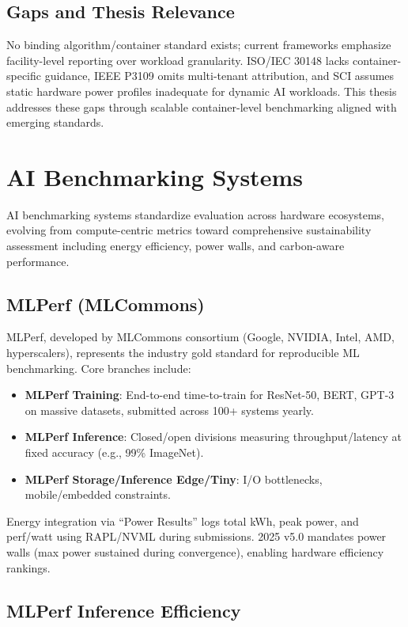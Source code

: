 \subsection{Gaps and Thesis Relevance}

No binding algorithm/container standard exists; current frameworks emphasize facility-level reporting over workload granularity. ISO/IEC 30148 lacks container-specific guidance, IEEE P3109 omits multi-tenant attribution, and SCI assumes static hardware power profiles inadequate for dynamic AI workloads. This thesis addresses these gaps through scalable container-level benchmarking aligned with emerging standards.

\section{AI Benchmarking Systems}

AI benchmarking systems standardize evaluation across hardware ecosystems, evolving from compute-centric metrics toward comprehensive sustainability assessment including energy efficiency, power walls, and carbon-aware performance.

\subsection{MLPerf (MLCommons)}

MLPerf, developed by MLCommons consortium (Google, NVIDIA, Intel, AMD, hyperscalers), represents the industry gold standard for reproducible ML benchmarking. Core branches include:

\begin{itemize}
    \item \textbf{MLPerf Training}: End-to-end time-to-train for ResNet-50, BERT, GPT-3 on massive datasets, submitted across 100+ systems yearly.
    \item \textbf{MLPerf Inference}: Closed/open divisions measuring throughput/latency at fixed accuracy (e.g., 99\% ImageNet).
    \item \textbf{MLPerf Storage/Inference Edge/Tiny}: I/O bottlenecks, mobile/embedded constraints.
\end{itemize}

Energy integration via ``Power Results'' logs total kWh, peak power, and perf/watt using RAPL/NVML during submissions. 2025 v5.0 mandates power walls (max power sustained during convergence), enabling hardware efficiency rankings.

\subsection{MLPerf Inference Efficiency}

